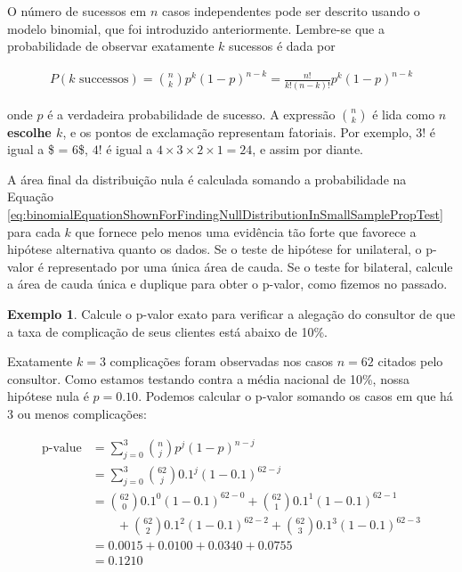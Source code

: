 \documentclass[
]{book}
\theoremstyle{definition}
\theoremstyle{definition}
\newtheorem{example}{Exemplo}[chapter]
\theoremstyle{definition}
\theoremstyle{definition}
\theoremstyle{remark}
\begin{document}
O número de sucessos em \(n\) casos independentes pode ser descrito usando o modelo binomial, que foi introduzido anteriormente. Lembre-se que a probabilidade de observar exatamente \(k\) sucessos é dada por

\begin{align} 
P(k\text{ successos}) = {n\choose k} p^{k}(1-p)^{n-k} = \frac{n!}{k!(n-k)!} p^{k}(1-p)^{n-k}
\label{eq:binomialEquationShownForFindingNullDistributionInSmallSamplePropTest}
\end{align}

onde \(p\) é a verdadeira probabilidade de sucesso. A expressão \({n\choose k}\) é lida como \textbf{\(n\) escolhe \(k\)}, e os pontos de exclamação representam fatoriais. Por exemplo, \(3!\) é igual a \$   = 6\$, \(4!\) é igual a \(4 \times 3 \times 2 \times 1 = 24\), e assim por diante.

A área final da distribuição nula é calculada somando a probabilidade na Equação \eqref{eq:binomialEquationShownForFindingNullDistributionInSmallSamplePropTest} para cada \(k\) que fornece pelo menos uma evidência tão forte que favorece a hipótese alternativa quanto os dados. Se o teste de hipótese for unilateral, o p-valor é representado por uma única área de cauda. Se o teste for bilateral, calcule a área de cauda única e duplique para obter o p-valor, como fizemos no passado.

\begin{example}
\protect\hypertarget{exm:unnamed-chunk-261}{}{\label{exm:unnamed-chunk-261} }Calcule o p-valor exato para verificar a alegação do consultor de que a taxa de complicação de seus clientes está abaixo de 10\%.
\end{example}

Exatamente \(k = 3\) complicações foram observadas nos casos \(n = 62\) citados pelo consultor. Como estamos testando contra a média nacional de 10\%, nossa hipótese nula é \(p = 0.10\). Podemos calcular o p-valor somando os casos em que há 3 ou menos complicações:

\begin{align*}
\text{p-value}
    &= \sum_{j=0}^{3} {n\choose j} p^{j}(1-p)^{n-j} \\
    &= \sum_{j=0}^{3} {62\choose j} 0.1^{j}(1-0.1)^{62-j} \\
    &= {62\choose 0} 0.1^{0}(1-0.1)^{62-0} +
        {62\choose 1} 0.1^{1}(1-0.1)^{62-1} \\
    & \qquad + {62\choose 2} 0.1^{2}(1-0.1)^{62-2} +
        {62\choose 3} 0.1^{3}(1-0.1)^{62-3} \\
    &= 0.0015 + 0.0100 + 0.0340 + 0.0755 \\
    &= 0.1210
\end{align*}
\end{document}
